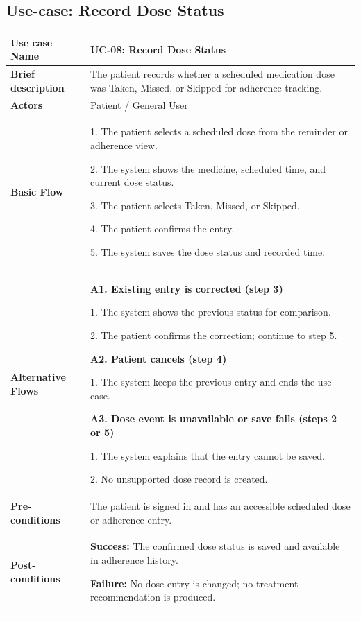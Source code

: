 \clearpage
\subsection{Use-case: Record Dose Status}
\label{uc:uc-08}
\begin{longtable}{|p{}|p{}|}
\hline
\textbf{Use case Name} & UC-08: Record Dose Status \\ \hline
\textbf{Brief description} & The patient records whether a scheduled medication dose was Taken, Missed, or Skipped for adherence tracking. \\ \hline
\textbf{Actors} & Patient / General User \\ \hline
\textbf{Basic Flow} &
1. The patient selects a scheduled dose from the reminder or adherence view.\par
2. The system shows the medicine, scheduled time, and current dose status.\par
3. The patient selects Taken, Missed, or Skipped.\par
4. The patient confirms the entry.\par
5. The system saves the dose status and recorded time.
\\ \hline
\textbf{Alternative Flows} &
\textbf{A1. Existing entry is corrected (step 3)}\par
1. The system shows the previous status for comparison.\par
2. The patient confirms the correction; continue to step 5.
\par\smallskip
\textbf{A2. Patient cancels (step 4)}\par
1. The system keeps the previous entry and ends the use case.
\par\smallskip
\textbf{A3. Dose event is unavailable or save fails (steps 2 or 5)}\par
1. The system explains that the entry cannot be saved.\par
2. No unsupported dose record is created.
\\ \hline
\textbf{Pre-conditions} & The patient is signed in and has an accessible scheduled dose or adherence entry. \\ \hline
\textbf{Post-conditions} & \textbf{Success:} The confirmed dose status is saved and available in adherence history.\par
\textbf{Failure:} No dose entry is changed; no treatment recommendation is produced. \\ \hline
\end{longtable}

